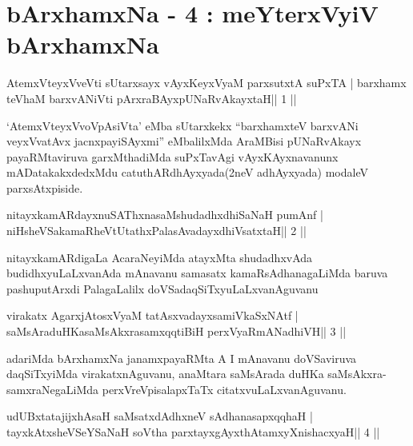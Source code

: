 \chapter{bArxhamxNa - 4 : meYterxVyiV bArxhamxNa}



\begin{shl}
AtemxVteyxVveVti sUtarxsayx vAyxKeyxVyaM parxsutxtA suPxTA |
barxhamx teV\s haM barxvANiVti pArxraBAyx\s\s pUNaRvAkayxtaH\hfill || 1 ||
\end{shl}

\begin{artha}
`AtemxVteyxVvoVpAsiVta' eMba sUtarxkekx ``barxhamxteV barxvANi   veyxVvatAvx jacnxpayiSAyxmi'' eMbalilxMda AraMBisi pUNaRvAkayx   payaRMtaviruva garxMthadiMda suPxTavAgi vAyxKAyxnavanunx   mADatakakxdedxMdu catuthARdhAyxyada(2neV adhAyxyada) modaleV   parxsAtxpiside.
\end{artha}


\begin{shl}
nitayxkamARdayxnuSAThxnasaMshudadhxdhiSaNaH pumAnf |
niHsheVSakamaRheVtUtathxPalasAvadayxdhiVsatxtaH\hfill || 2 ||
\end{shl}

\begin{artha}
nitayxkamARdigaLa AcaraNeyiMda atayxMta shudadhxvAda
budidhxyuLaLxvanAda mAnavanu samasatx kamaRsAdhanagaLiMda baruva
pashuputArxdi PalagaLalilx doVSadaqSiTxyuLaLxvanAguvanu 
\end{artha}

\begin{shl}
virakatx AgarxjAtosxV\s yaM tatAsxvadayxsamiVkaSxNAtf |
saMsAraduHKasaMsAkxrasamxqqtiBiH perxVyaRmANadhiVH\hfill || 3 ||
\end{shl}

\begin{artha}
adariMda bArxhamxNa janamxpayaRMta A I mAnavanu doVSaviruva
daqSiTxyiMda virakatxnAguvanu, anaMtara saMsArada duHKa
saMsAkxra-samxraNegaLiMda perxVreVpisalapxTaTx citatxvuLaLxvanAguvanu. 
\end{artha}

\begin{shl}
udUBxtatajijxhAsaH saMsatxdAdhxneV sAdhanasapxqqhaH |
tayxkAtxsheVSeYSaNaH soV\s tha parxtayxgAyxthAtamxyXnishacxyaH\hfill || 4 ||
\end{shl}

